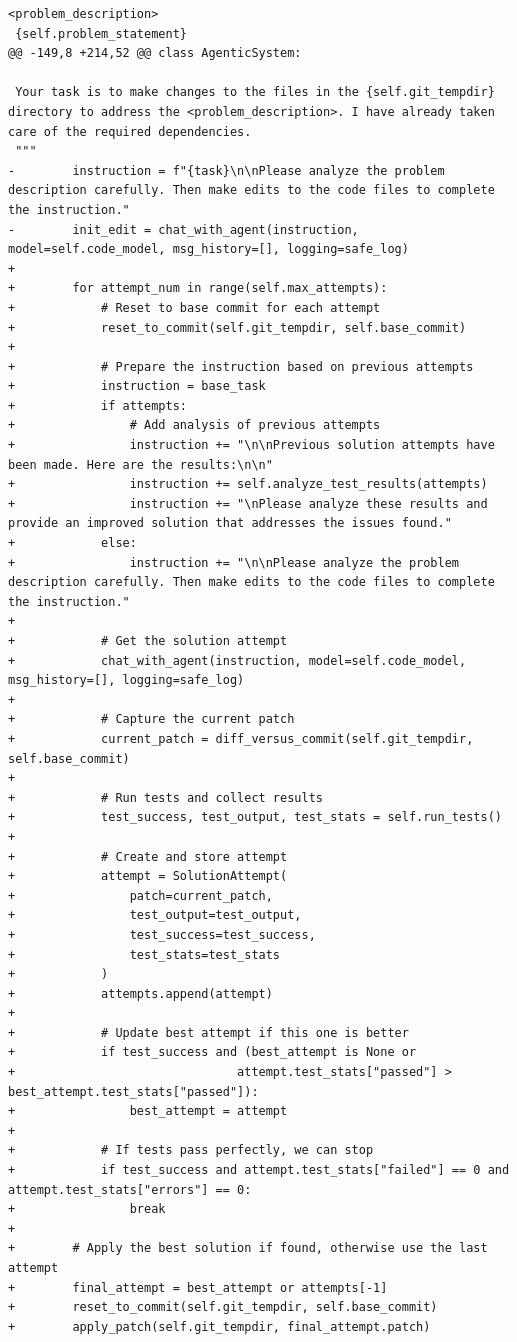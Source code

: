 \documentclass{article}
\begin{document}
\begin{lstlisting}[style=diffstyle]
 <problem_description>
 {self.problem_statement}
@@ -149,8 +214,52 @@ class AgenticSystem:
 
 Your task is to make changes to the files in the {self.git_tempdir} directory to address the <problem_description>. I have already taken care of the required dependencies.
 """
-        instruction = f"{task}\n\nPlease analyze the problem description carefully. Then make edits to the code files to complete the instruction."
-        init_edit = chat_with_agent(instruction, model=self.code_model, msg_history=[], logging=safe_log)
+
+        for attempt_num in range(self.max_attempts):
+            # Reset to base commit for each attempt
+            reset_to_commit(self.git_tempdir, self.base_commit)
+            
+            # Prepare the instruction based on previous attempts
+            instruction = base_task
+            if attempts:
+                # Add analysis of previous attempts
+                instruction += "\n\nPrevious solution attempts have been made. Here are the results:\n\n"
+                instruction += self.analyze_test_results(attempts)
+                instruction += "\nPlease analyze these results and provide an improved solution that addresses the issues found."
+            else:
+                instruction += "\n\nPlease analyze the problem description carefully. Then make edits to the code files to complete the instruction."
+
+            # Get the solution attempt
+            chat_with_agent(instruction, model=self.code_model, msg_history=[], logging=safe_log)
+            
+            # Capture the current patch
+            current_patch = diff_versus_commit(self.git_tempdir, self.base_commit)
+            
+            # Run tests and collect results 
+            test_success, test_output, test_stats = self.run_tests()
+            
+            # Create and store attempt
+            attempt = SolutionAttempt(
+                patch=current_patch,
+                test_output=test_output,
+                test_success=test_success,
+                test_stats=test_stats
+            )
+            attempts.append(attempt)
+            
+            # Update best attempt if this one is better
+            if test_success and (best_attempt is None or 
+                               attempt.test_stats["passed"] > best_attempt.test_stats["passed"]):
+                best_attempt = attempt
+            
+            # If tests pass perfectly, we can stop
+            if test_success and attempt.test_stats["failed"] == 0 and attempt.test_stats["errors"] == 0:
+                break
+        
+        # Apply the best solution if found, otherwise use the last attempt
+        final_attempt = best_attempt or attempts[-1]
+        reset_to_commit(self.git_tempdir, self.base_commit)
+        apply_patch(self.git_tempdir, final_attempt.patch)
 

\end{lstlisting}
\end{document}
